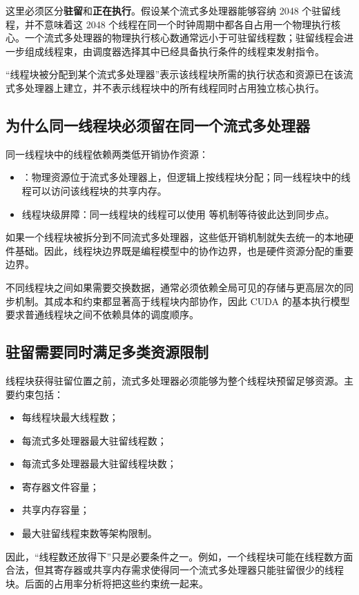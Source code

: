 这里必须区分\textbf{驻留}和\textbf{正在执行}。假设某个流式多处理器能够容纳 2048 个驻留线程，并不意味着这 2048 个线程在同一个时钟周期中都各自占用一个物理执行核心。一个流式多处理器的物理执行核心数通常远小于可驻留线程数；驻留线程会进一步组成线程束，由调度器选择其中已经具备执行条件的线程束发射指令。

\begin{keybox}
“线程块被分配到某个流式多处理器”表示该线程块所需的执行状态和资源已在该流式多处理器上建立，并不表示线程块中的所有线程同时占用独立核心执行。
\end{keybox}

\subsection{为什么同一线程块必须留在同一个流式多处理器}

同一线程块中的线程依赖两类低开销协作资源：

\begin{itemize}
  \item {}：物理资源位于流式多处理器上，但逻辑上按线程块分配；同一线程块中的线程可以访问该线程块的共享内存。
  \item 线程块级屏障：同一线程块的线程可以使用  等机制等待彼此达到同步点。
\end{itemize}

如果一个线程块被拆分到不同流式多处理器，这些低开销机制就失去统一的本地硬件基础。因此，线程块边界既是编程模型中的协作边界，也是硬件资源分配的重要边界。

不同线程块之间如果需要交换数据，通常必须依赖全局可见的存储与更高层次的同步机制。其成本和约束都显著高于线程块内部协作，因此 CUDA 的基本执行模型要求普通线程块之间不依赖具体的调度顺序。

\subsection{驻留需要同时满足多类资源限制}

线程块获得驻留位置之前，流式多处理器必须能够为整个线程块预留足够资源。主要约束包括：

\begin{itemize}
  \item 每线程块最大线程数；
  \item 每流式多处理器最大驻留线程数；
  \item 每流式多处理器最大驻留线程块数；
  \item 寄存器文件容量；
  \item 共享内存容量；
  \item 最大驻留线程束数等架构限制。
\end{itemize}

因此，“线程数还放得下”只是必要条件之一。例如，一个线程块可能在线程数方面合法，但其寄存器或共享内存需求使得同一个流式多处理器只能驻留很少的线程块。后面的占用率分析将把这些约束统一起来。
